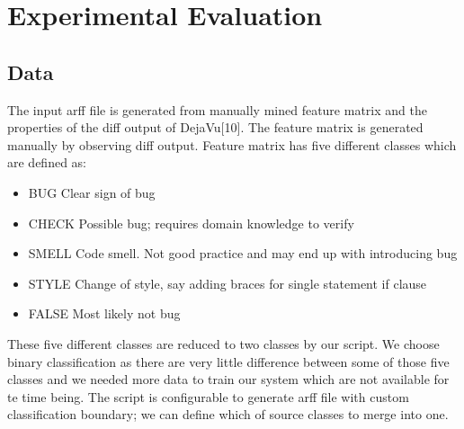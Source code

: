 \documentclass[nocopyrightspace]{sigplanconf}
\begin{document}

\section{Experimental Evaluation}
\subsection{Data}
The input arff file is generated from manually mined feature matrix and the properties of the diff output of DejaVu[10]. The feature matrix is generated manually by observing diff output. Feature matrix has five different classes which are defined as:

\begin{itemize}
\item BUG		Clear sign of bug
\item CHECK	Possible bug; requires domain knowledge to verify
\item SMELL	Code smell. Not good practice and may end up with introducing bug
\item STYLE     	Change of style, say adding braces for single statement if clause
\item FALSE     	Most likely not bug
\end{itemize}

\vspace{10 pt}
\noindent
These five different classes are reduced to two classes by our script. We choose binary classification as there are very little difference between some of those five classes and we needed more data to train our system which are not available for te time being. The script is configurable to generate arff file with custom classification boundary; we can define which of source classes to merge into one.
\end{document}
